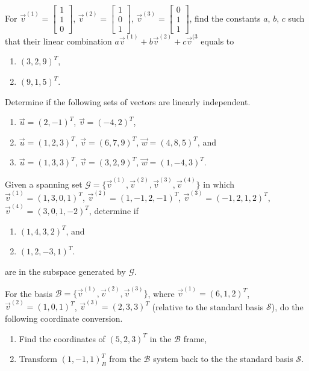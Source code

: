 \begin{Exercise}
For $\vec{v}^{(1)} =
\begin{bmatrix}
1\\
1\\
0
\end{bmatrix}$,
$\vec{v}^{(2)} =
\begin{bmatrix}
1\\
0\\
1
\end{bmatrix}$,
$\vec{v}^{(3)} =
\begin{bmatrix}
0\\
1\\
1
\end{bmatrix}$,
find the constants $a$, $b$, $c$ such that their linear combination $a\vec{v}^{(1)} + b\vec{v}^{(2)} + c\vec{v}^{(3}$ equals to 
\begin{enumerate}[label=(\alph*)]
\item $(3,2,9)^T$, 
\item $(9,1,5)^T$.
\end{enumerate}
\end{Exercise}

\begin{Exercise}
Determine if the following sets of vectors are linearly independent.
\begin{enumerate}[label=(\alph*)]
\item $\vec{u} = (2,-1)^T$, $\vec{v} = (-4,2)^T$,
\item $\vec{u} = (1,2,3)^T$, $\vec{v} = (6,7,9)^T$, $\vec{w} = (4,8,5)^T$, and
\item $\vec{u} = (1,3,3)^T$, $\vec{v}=(3,2,9)^T$, $\vec{w} = (1,-4,3)^T$.
\end{enumerate}
\end{Exercise}

\begin{Exercise}
Given a spanning set $\mathcal{G} = \{\vec{v}^{(1)}, \vec{v}^{(2)}, \vec{v}^{(3)}, \vec{v}^{(4)}\}$ in which $\vec{v}^{(1)} = (1,3,0,1)^T$, $\vec{v}^{(2)} = (1,-1,2,-1)^T$, $\vec{v}^{(3)} = (-1,2,1,2)^T$, $\vec{v}^{(4)} = (3,0,1,-2)^T$, determine if 
\begin{enumerate}[label=(\alph*)]
\item $(1,4,3,2)^T$, and
\item $(1,2,-3,1)^T$.
\end{enumerate}
are in the subspace generated by $\mathcal{G}$.
\end{Exercise}

\begin{Exercise}
For the basis $\mathcal{B} = \{\vec{v}^{(1)}, \vec{v}^{(2)}, \vec{v}^{(3)}\}$, where $\vec{v}^{(1)} = (6,1,2)^T$,
$\vec{v}^{(2)} = (1,0,1)^T$,
$\vec{v}^{(3)} = (2,3,3)^T$
(relative to the standard basis $\mathcal{S}$), do the following coordinate conversion.
\begin{enumerate}[label=(\alph*)]
\item Find the coordinates of $(5, 2, 3)^T$ in the $\mathcal{B}$ frame,
\item Transform $(1, -1, 1)^T_B$ from the $\mathcal{B}$ system back to the the standard basis $\mathcal{S}$.
\end{enumerate}
\end{Exercise}

